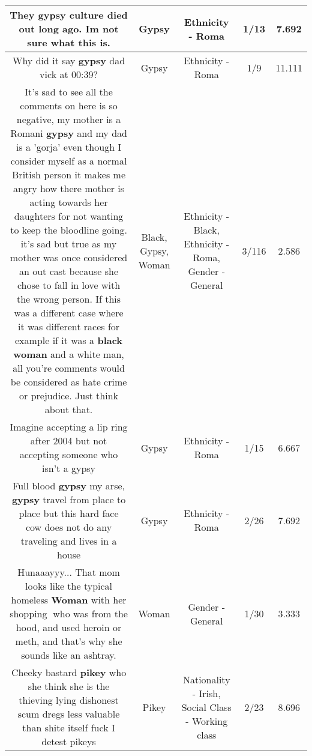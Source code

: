 \documentclass[11pt]{article}
\newlength\mylength
\begin{document}
\begin{center}
\begin{longtable}{|C{.65\mylength}|C{.30\mylength}|C{.12\mylength}|C{.12\mylength}|C{.12\mylength}|}
  \small They \textbf{gypsy} culture died out long ago. Im not sure what this is.\normalsize   & Gypsy & Ethnicity - Roma & 1/13 & 7.692 \\  \hline
  \small Why did it say \textbf{gypsy} dad vick at 00:39?\normalsize   & Gypsy & Ethnicity - Roma & 1/9 & 11.111 \\  \hline
  \small It's sad to see all the comments on here is so negative, my mother is a Romani \textbf{gypsy} and my dad is a 'gorja' even though I consider myself as a normal British person it makes me angry how there mother is acting towards her daughters for not wanting to keep the bloodline going. it's sad but true as my mother was once considered an out cast because she chose to fall in love with the wrong person. If this was a different case where it was different races for example if it was a \textbf{black} \textbf{woman} and a white man, all you're comments would be considered as hate crime or prejudice. Just think about that.\normalsize   & Black, Gypsy, Woman & Ethnicity - Black, Ethnicity - Roma, Gender - General & 3/116 & 2.586 \\  \hline
  \small Imagine accepting a lip ring after 2004 but not accepting someone who isn't a gypsy\normalsize   & Gypsy & Ethnicity - Roma & 1/15 & 6.667 \\  \hline
  \small Full blood \textbf{gypsy} my arse, \textbf{gypsy} travel from place to place but this hard face cow does not do any traveling and lives in a house\normalsize   & Gypsy & Ethnicity - Roma & 2/26 & 7.692 \\  \hline
  \small Hunaaayyy... That mom looks like the typical homeless \textbf{Woman} with her shopping🛒 who was from the hood, and used heroin or meth, and that's why she sounds like an ashtray.\normalsize   & Woman & Gender - General & 1/30 & 3.333 \\  \hline
  \small Cheeky bastard \textbf{p\textbf{ikey}} who she think she is the thieving lying dishonest scum dregs less valuable than shite itself fuck I detest pikeys\normalsize   & Pikey & Nationality - Irish, Social Class - Working class & 2/23 & 8.696 \\  \hline

\end{longtable}
\end{center}
\end{document}
